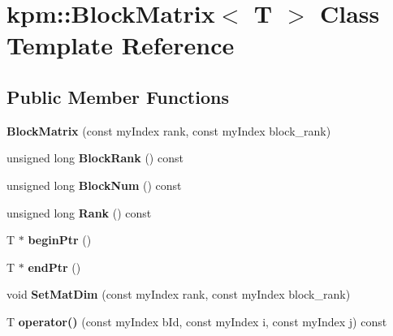 \hypertarget{classkpm_1_1BlockMatrix}{}\section{kpm\+:\+:Block\+Matrix$<$ T $>$ Class Template Reference}
\label{classkpm_1_1BlockMatrix}
\subsection*{Public Member Functions}
\begin{DoxyCompactItemize}
\item 
{\bfseries Block\+Matrix} (const my\+Index rank, const my\+Index block\+\_\+rank)\hypertarget{classkpm_1_1BlockMatrix_a8886dba610d839ed58917f9129fbed48}{}\label{classkpm_1_1BlockMatrix_a8886dba610d839ed58917f9129fbed48}

\item 
unsigned long {\bfseries Block\+Rank} () const \hypertarget{classkpm_1_1BlockMatrix_a3c8b5a26281fbfb0cc187320adad8c05}{}\label{classkpm_1_1BlockMatrix_a3c8b5a26281fbfb0cc187320adad8c05}

\item 
unsigned long {\bfseries Block\+Num} () const \hypertarget{classkpm_1_1BlockMatrix_a6e0cc2e9fcb782bf005180d5b3e117c4}{}\label{classkpm_1_1BlockMatrix_a6e0cc2e9fcb782bf005180d5b3e117c4}

\item 
unsigned long {\bfseries Rank} () const \hypertarget{classkpm_1_1BlockMatrix_a13d947a022417018a35da95531a5b2f2}{}\label{classkpm_1_1BlockMatrix_a13d947a022417018a35da95531a5b2f2}

\item 
T $\ast$ {\bfseries begin\+Ptr} ()\hypertarget{classkpm_1_1BlockMatrix_ac584e0f474e1c6a15134eed9cf5b4287}{}\label{classkpm_1_1BlockMatrix_ac584e0f474e1c6a15134eed9cf5b4287}

\item 
T $\ast$ {\bfseries end\+Ptr} ()\hypertarget{classkpm_1_1BlockMatrix_ab7bebfcfaa6d1715cff3b3bee1915cb3}{}\label{classkpm_1_1BlockMatrix_ab7bebfcfaa6d1715cff3b3bee1915cb3}

\item 
void {\bfseries Set\+Mat\+Dim} (const my\+Index rank, const my\+Index block\+\_\+rank)\hypertarget{classkpm_1_1BlockMatrix_a95c886722fd9d5c3e412ef56d3191d5d}{}\label{classkpm_1_1BlockMatrix_a95c886722fd9d5c3e412ef56d3191d5d}

\item 
T {\bfseries operator()} (const my\+Index b\+Id, const my\+Index i, const my\+Index j) const \hypertarget{classkpm_1_1BlockMatrix_a7ae2d1741dc1ccf6a8e8fe05227cf27a}{}\label{classkpm_1_1BlockMatrix_a7ae2d1741dc1ccf6a8e8fe05227cf27a}


\end{DoxyCompactItemize}
